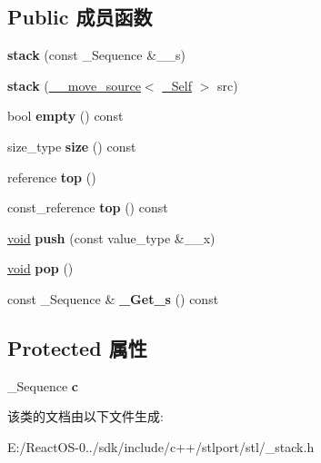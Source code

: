 \subsection*{Public 成员函数}
\begin{DoxyCompactItemize}
\item 
\mbox{\label{classstack_aa4e790567e18ff5b7ba7781ca44c4e72}} 
{\bfseries stack} (const \+\_\+\+Sequence \&\+\_\+\+\_\+s)
\item 
\mbox{\label{classstack_a026d5ccab7fbe34c0312b24908d6fdb8}} 
{\bfseries stack} (\hyperlink{class____move__source}{\+\_\+\+\_\+move\+\_\+source}$<$ \hyperlink{classstack}{\+\_\+\+Self} $>$ src)
\item 
\mbox{\label{classstack_a0823bed91137a8f1385f27a4ca323edc}} 
bool {\bfseries empty} () const
\item 
\mbox{\label{classstack_af9e99e0e528b5fcf88892f5497e7544f}} 
size\+\_\+type {\bfseries size} () const
\item 
\mbox{\label{classstack_a1acb8649d0a485f44820ab8985adf37b}} 
reference {\bfseries top} ()
\item 
\mbox{\label{classstack_ac28815acaab14d844bc0735ebb68b1c9}} 
const\+\_\+reference {\bfseries top} () const
\item 
\mbox{\label{classstack_a7d7b35b187c8aba5805f12a1ec3fac9e}} 
\hyperlink{interfacevoid}{void} {\bfseries push} (const value\+\_\+type \&\+\_\+\+\_\+x)
\item 
\mbox{\label{classstack_a9332faacb38f5dcb799117dbd1fba2b0}} 
\hyperlink{interfacevoid}{void} {\bfseries pop} ()
\item 
\mbox{\label{classstack_aa5713119abbcd6e475dadfa0d5328de2}} 
const \+\_\+\+Sequence \& {\bfseries \+\_\+\+Get\+\_\+s} () const
\end{DoxyCompactItemize}
\subsection*{Protected 属性}
\begin{DoxyCompactItemize}
\item 
\mbox{\label{classstack_a166eedeef0e5605ef6d0aef8bb29a025}} 
\+\_\+\+Sequence {\bfseries c}
\end{DoxyCompactItemize}


该类的文档由以下文件生成\+:\begin{DoxyCompactItemize}
\item 
E\+:/\+React\+O\+S-\/0../sdk/include/c++/stlport/stl/\+\_\+stack.\+h\end{DoxyCompactItemize}

